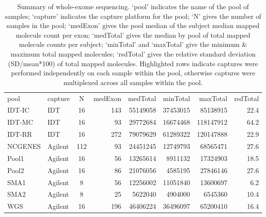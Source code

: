 \begin{table}[]
\centering
\begin{tabular}{llcrrrrr}
  \toprule
pool & capture & N & medExon & medTotal & minTotal & maxTotal & rsdTotal \\ 
  \rowcolor[gray]{0.9}  \midrule
IDT-IC & IDT & 16 & \num{143} & \num{55149058} & \num{37453015} & \num{85138915} & \num{22.4} \\ 
  IDT-MC & IDT & 16 & \num{93} & \num{29772684} & \num{16674468} & \num{118147912} & \num{64.2} \\ 
  IDT-RR & IDT & 16 & \num{272} & \num{79079629} & \num{61289322} & \num{120147888} & \num{22.9} \\ 
   \rowcolor[gray]{0.9} NCGENES & Agilent & 112 & \num{93} & \num{24451245} & \num{12749793} & \num{68565471} & \num{27.6} \\ 
  Pool1 & Agilent & 16 & \num{56} & \num{13265614} & \num{8911132} & \num{17324903} & \num{18.5} \\ 
  Pool2 & Agilent & 16 & \num{86} & \num{21076056} & \num{4585195} & \num{27846146} & \num{27.6} \\ 
  SMA1 & Agilent & 8 & \num{56} & \num{12256002} & \num{11051840} & \num{13600697} & \num{6.2} \\ 
  SMA2 & Agilent & 8 & \num{25} & \num{5622040} & \num{4904000} & \num{6545360} & \num{10.4} \\ 
  WGS & Agilent & 16 & \num{196} & \num{46406224} & \num{36496097} & \num{65200410} & \num{16.4} \\ 
   \bottomrule
\end{tabular}
\caption{Summary of whole-exome sequencing. `pool' indicates the name of the pool of samples; `capture' indicates the capture platform for the pool; `N' gives the number of samples in the pool; `medExon' gives the pool median of the subject median mapped molecule count per exon; `medTotal' gives the median by pool of total mapped molecule counts per subject; `minTotal' and `maxTotal' give the minimum \& maximum total mapped molecules; `rsdTotal' gives the relative standard deviation (SD/mean*100) of total mapped molecules.  Highlighted rows indicate captures were performed independently on each sample within the pool, otherwise captures were multiplexed across all samples within the pool.} 
\label{tab:poolSummary}
\end{table}
